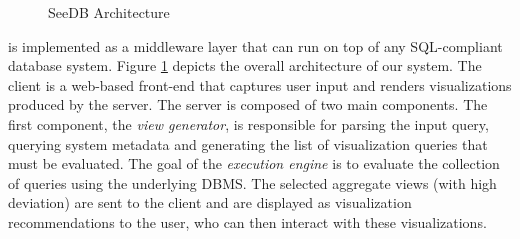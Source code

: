 \begin{figure}[htb]
\vspace{-10pt}
\centerline{
\hbox{}}
\vspace{-18pt}
\caption{SeeDB Architecture}
\label{fig:sys-arch}
\vspace{-12pt}
\end{figure} 


\SeeDB is implemented as a middleware layer that can run on
top of any SQL-compliant database system. 
Figure \ref{fig:sys-arch} depicts the overall architecture of our
system.  The \SeeDB client is a web-based front-end that captures user
input and renders visualizations produced by the \SeeDB server.  The
\SeeDB server is composed of two main components.  The first
component, the {\it view generator}, is responsible for parsing the
input query, querying system metadata and generating the list of
visualization queries that must be evaluated.  
The goal of the {\em execution engine} is to evaluate the collection of queries
using the underlying DBMS.
The selected aggregate views (with high deviation) 
are sent to the \SeeDB client 
and are displayed as visualization recommendations to the user, 
who can then interact with these
visualizations.

